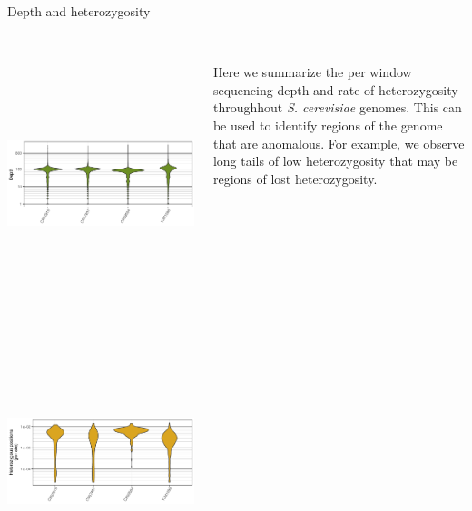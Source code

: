 
\begin{columns}[t]
  \begin{column}{0.40\textwidth}
    \begin{block}{\large Depth and heterozygosity}

      \begin{columns}
        \begin{column}{0.45\textwidth}
          \includegraphics[height=8cm]{./figures/fig2_scer_dp_vplot.pdf}
          \newline
          \includegraphics[height=8cm]{./figures/fig3_scer_het_vplot.pdf}
        \end{column}
        \begin{column}{0.53\textwidth}
\scriptsize
\\
\vspace{10mm}
Here we summarize the per window sequencing depth and rate of heterozygosity throughhout \textit{S. cerevisiae} genomes.
This can be used to identify regions of the genome that are anomalous.
For example, we observe long tails of low heterozygosity that may be regions of lost heterozygosity.
\vspace{22mm}
        \end{column}
      \end{columns}


\end{block}
\end{column}
\end{columns}
